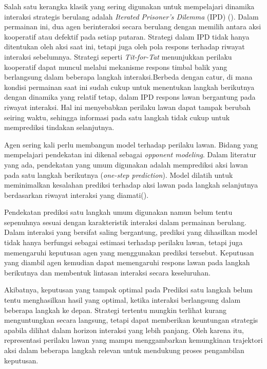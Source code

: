 Salah satu kerangka klasik yang sering digunakan untuk mempelajari dinamika interaksi strategis berulang adalah \textit{Iterated Prisoner's Dilemma} (IPD) (\cite{axelrod_evolution_1981}). Dalam permainan ini, dua agen berinteraksi secara berulang dengan memilih antara aksi kooperatif atau defektif pada setiap putaran. Strategi dalam IPD tidak hanya ditentukan oleh aksi saat ini, tetapi juga oleh pola respons terhadap riwayat interaksi sebelumnya. Strategi seperti \textit{Tit-for-Tat} menunjukkan perilaku kooperatif dapat muncul melalui mekanisme respons timbal balik yang berlangsung dalam beberapa langkah interaksi.Berbeda dengan catur, di mana kondisi permainan saat ini sudah cukup untuk menentukan langkah berikutnya dengan dinamika yang relatif tetap, dalam IPD respons lawan bergantung pada riwayat interaksi. Hal ini menyebabkan perilaku lawan dapat tampak berubah seiring waktu, sehingga informasi pada satu langkah tidak cukup untuk memprediksi tindakan selanjutnya.

Agen sering kali perlu membangun model terhadap perilaku lawan. Bidang yang mempelajari pendekatan ini dikenal sebagai \textit{opponent modeling}. Dalam literatur yang ada, pendekatan yang umum digunakan adalah memprediksi aksi lawan pada satu langkah berikutnya (\textit{one-step prediction}). Model dilatih untuk meminimalkan kesalahan prediksi terhadap aksi lawan pada langkah selanjutnya berdasarkan riwayat interaksi yang diamati(\cite{nashed_survey_2022}).

Pendekatan prediksi satu langkah umum digunakan namun belum tentu sepenuhnya sesuai dengan karakteristik interaksi dalam permainan berulang. Dalam interaksi yang bersifat saling bergantung, prediksi yang dihasilkan model tidak hanya berfungsi sebagai estimasi terhadap perilaku lawan, tetapi juga memengaruhi keputusan agen yang menggunakan prediksi tersebut. Keputusan yang diambil agen kemudian dapat memengaruhi respons lawan pada langkah berikutnya dan membentuk lintasan interaksi secara keseluruhan.

Akibatnya, keputusan yang tampak optimal pada Prediksi satu langkah belum tentu menghasilkan hasil yang optimal, ketika interaksi berlangsung dalam beberapa langkah ke depan. Strategi tertentu mungkin terlihat kurang menguntungkan secara langsung, tetapi dapat memberikan keuntungan strategis apabila dilihat dalam horizon interaksi yang lebih panjang. Oleh karena itu, representasi perilaku lawan yang mampu menggambarkan kemungkinan trajektori aksi dalam beberapa langkah relevan untuk mendukung proses pengambilan keputusan.


